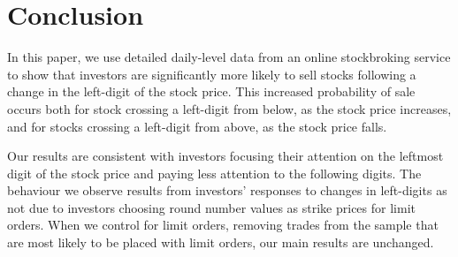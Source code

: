 \section{Conclusion}\label{sec:conclusion}

In this paper, we use detailed daily-level data from an online stockbroking service to show that investors are significantly more likely to sell stocks following a change in the left-digit of the stock price. This increased probability of sale occurs both for stock crossing a left-digit from below, as the stock price increases, and for stocks crossing a left-digit from above, as the stock price falls.

Our results are consistent with investors focusing their attention on the leftmost digit of the stock price and paying less attention to the following digits. The behaviour we observe results from investors' responses to changes in left-digits as not due to investors choosing round number values as strike prices for limit orders. When we control for limit orders, removing trades from the sample that are most likely to be placed with limit orders, our main results are unchanged.



